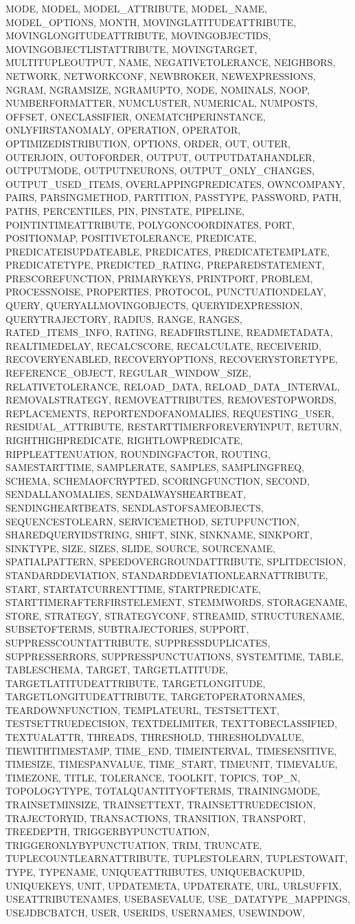 {{MODE, MODEL, MODEL_ATTRIBUTE, MODEL_NAME, MODEL_OPTIONS, MONTH, MOVINGLATITUDEATTRIBUTE, MOVINGLONGITUDEATTRIBUTE, MOVINGOBJECTIDS, MOVINGOBJECTLISTATTRIBUTE, MOVINGTARGET, MULTITUPLEOUTPUT, NAME, NEGATIVETOLERANCE, NEIGHBORS, NETWORK, NETWORKCONF, NEWBROKER, NEWEXPRESSIONS, NGRAM, NGRAMSIZE, NGRAMUPTO, NODE, NOMINALS, NOOP, NUMBERFORMATTER, NUMCLUSTER, NUMERICAL, NUMPOSTS, OFFSET, ONECLASSIFIER, ONEMATCHPERINSTANCE, ONLYFIRSTANOMALY, OPERATION, OPERATOR, OPTIMIZEDISTRIBUTION, OPTIONS, ORDER, OUT, OUTER, OUTERJOIN, OUTOFORDER, OUTPUT, OUTPUTDATAHANDLER, OUTPUTMODE, OUTPUTNEURONS, OUTPUT_ONLY_CHANGES, OUTPUT_USED_ITEMS, OVERLAPPINGPREDICATES, OWNCOMPANY, PAIRS, PARSINGMETHOD, PARTITION, PASSTYPE, PASSWORD, PATH, PATHS, PERCENTILES, PIN, PINSTATE, PIPELINE, POINTINTIMEATTRIBUTE, POLYGONCOORDINATES, PORT, POSITIONMAP, POSITIVETOLERANCE, PREDICATE, PREDICATEISUPDATEABLE, PREDICATES, PREDICATETEMPLATE, PREDICATETYPE, PREDICTED_RATING, PREPAREDSTATEMENT, PRESCOREFUNCTION, PRIMARYKEYS, PRINTPORT, PROBLEM, PROCESSNOISE, PROPERTIES, PROTOCOL, PUNCTUATIONDELAY, QUERY, QUERYALLMOVINGOBJECTS, QUERYIDEXPRESSION, QUERYTRAJECTORY, RADIUS, RANGE, RANGES, RATED_ITEMS_INFO, RATING, READFIRSTLINE, READMETADATA, REALTIMEDELAY, RECALCSCORE, RECALCULATE, RECEIVERID, RECOVERYENABLED, RECOVERYOPTIONS, RECOVERYSTORETYPE, REFERENCE_OBJECT, REGULAR_WINDOW_SIZE, RELATIVETOLERANCE, RELOAD_DATA, RELOAD_DATA_INTERVAL, REMOVALSTRATEGY, REMOVEATTRIBUTES, REMOVESTOPWORDS, REPLACEMENTS, REPORTENDOFANOMALIES, REQUESTING_USER, RESIDUAL_ATTRIBUTE, RESTARTTIMERFOREVERYINPUT, RETURN, RIGHTHIGHPREDICATE, RIGHTLOWPREDICATE, RIPPLEATTENUATION, ROUNDINGFACTOR, ROUTING, SAMESTARTTIME, SAMPLERATE, SAMPLES, SAMPLINGFREQ, SCHEMA, SCHEMAOFCRYPTED, SCORINGFUNCTION, SECOND, SENDALLANOMALIES, SENDALWAYSHEARTBEAT, SENDINGHEARTBEATS, SENDLASTOFSAMEOBJECTS, SEQUENCESTOLEARN, SERVICEMETHOD, SETUPFUNCTION, SHAREDQUERYIDSTRING, SHIFT, SINK, SINKNAME, SINKPORT, SINKTYPE, SIZE, SIZES, SLIDE, SOURCE, SOURCENAME, SPATIALPATTERN, SPEEDOVERGROUNDATTRIBUTE, SPLITDECISION, STANDARDDEVIATION, STANDARDDEVIATIONLEARNATTRIBUTE, START, STARTATCURRENTTIME, STARTPREDICATE, STARTTIMERAFTERFIRSTELEMENT, STEMMWORDS, STORAGENAME, STORE, STRATEGY, STRATEGYCONF, STREAMID, STRUCTURENAME, SUBSETOFTERMS, SUBTRAJECTORIES, SUPPORT, SUPPRESSCOUNTATTRIBUTE, SUPPRESSDUPLICATES, SUPPRESSERRORS, SUPPRESSPUNCTUATIONS, SYSTEMTIME, TABLE, TABLESCHEMA, TARGET, TARGETLATITUDE, TARGETLATITUDEATTRIBUTE, TARGETLONGITUDE, TARGETLONGITUDEATTRIBUTE, TARGETOPERATORNAMES, TEARDOWNFUNCTION, TEMPLATEURL, TESTSETTEXT, TESTSETTRUEDECISION, TEXTDELIMITER, TEXTTOBECLASSIFIED, TEXTUALATTR, THREADS, THRESHOLD, THRESHOLDVALUE, TIEWITHTIMESTAMP, TIME_END, TIMEINTERVAL, TIMESENSITIVE, TIMESIZE, TIMESPANVALUE, TIME_START, TIMEUNIT, TIMEVALUE, TIMEZONE, TITLE, TOLERANCE, TOOLKIT, TOPICS, TOP_N, TOPOLOGYTYPE, TOTALQUANTITYOFTERMS, TRAININGMODE, TRAINSETMINSIZE, TRAINSETTEXT, TRAINSETTRUEDECISION, TRAJECTORYID, TRANSACTIONS, TRANSITION, TRANSPORT, TREEDEPTH, TRIGGERBYPUNCTUATION, TRIGGERONLYBYPUNCTUATION, TRIM, TRUNCATE, TUPLECOUNTLEARNATTRIBUTE, TUPLESTOLEARN, TUPLESTOWAIT, TYPE, TYPENAME, UNIQUEATTRIBUTES, UNIQUEBACKUPID, UNIQUEKEYS, UNIT, UPDATEMETA, UPDATERATE, URL, URLSUFFIX, USEATTRIBUTENAMES, USEBASEVALUE, USE_DATATYPE_MAPPINGS, USEJDBCBATCH, USER, USERIDS, USERNAMES, USEWINDOW, }}
